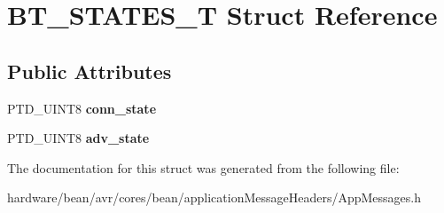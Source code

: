 \hypertarget{struct_b_t___s_t_a_t_e_s___t}{}\section{B\+T\+\_\+\+S\+T\+A\+T\+E\+S\+\_\+T Struct Reference}
\label{struct_b_t___s_t_a_t_e_s___t}
\subsection*{Public Attributes}
\begin{DoxyCompactItemize}
\item 
P\+T\+D\+\_\+\+U\+I\+N\+T8 {\bfseries conn\+\_\+state}\hypertarget{struct_b_t___s_t_a_t_e_s___t_a06b16edf83d9bf148d6d9f238787998d}{}\label{struct_b_t___s_t_a_t_e_s___t_a06b16edf83d9bf148d6d9f238787998d}

\item 
P\+T\+D\+\_\+\+U\+I\+N\+T8 {\bfseries adv\+\_\+state}\hypertarget{struct_b_t___s_t_a_t_e_s___t_a346ea237f71d6e001b75170b6410d94d}{}\label{struct_b_t___s_t_a_t_e_s___t_a346ea237f71d6e001b75170b6410d94d}

\end{DoxyCompactItemize}


The documentation for this struct was generated from the following file\+:\begin{DoxyCompactItemize}
\item 
hardware/bean/avr/cores/bean/application\+Message\+Headers/App\+Messages.\+h\end{DoxyCompactItemize}

